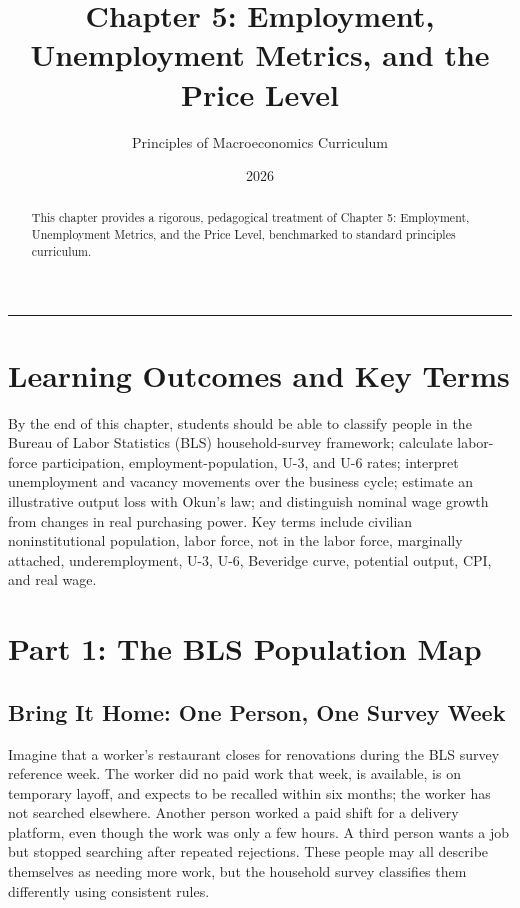 \documentclass[11pt,letterpaper]{article}
\begin{document}
\title{\Huge\bfseries\color{SlateBlue} Chapter 5: Employment, Unemployment Metrics, and the Price Level}
\author{\large Principles of Macroeconomics Curriculum}
\date{2026}
\maketitle

\thispagestyle{plain}

\begin{abstract}
This chapter provides a rigorous, pedagogical treatment of Chapter 5: Employment, Unemployment Metrics, and the Price Level, benchmarked to standard principles curriculum.
\end{abstract}

\tableofcontents
\vspace{1.5em}
\hrule
\vspace{1.5em}

\section{Learning Outcomes and Key Terms}
By the end of this chapter, students should be able to classify people in the Bureau of Labor Statistics (BLS) household-survey framework; calculate labor-force participation, employment-population, U-3, and U-6 rates; interpret unemployment and vacancy movements over the business cycle; estimate an illustrative output loss with Okun's law; and distinguish nominal wage growth from changes in real purchasing power. Key terms include civilian noninstitutional population, labor force, not in the labor force, marginally attached, underemployment, U-3, U-6, Beveridge curve, potential output, CPI, and real wage.

\section{Part 1: The BLS Population Map}
\subsection{Bring It Home: One Person, One Survey Week}
Imagine that a worker's restaurant closes for renovations during the BLS survey reference week. The worker did no paid work that week, is available, is on temporary layoff, and expects to be recalled within six months; the worker has not searched elsewhere. Another person worked a paid shift for a delivery platform, even though the work was only a few hours. A third person wants a job but stopped searching after repeated rejections. These people may all describe themselves as needing more work, but the household survey classifies them differently using consistent rules.
\end{document}
